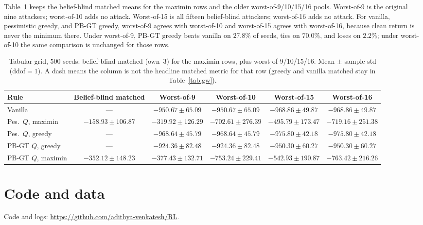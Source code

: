 \documentclass[10pt,twocolumn]{article}
\begin{document}
Table~\ref{tab:gw-w910} keeps the belief-blind matched means for the maximin rows and the older worst-of-9/10/15/16 pools.
Worst-of-9 is the original nine attackers; worst-of-10 adds no attack.
Worst-of-15 is all fifteen belief-blind attackers; worst-of-16 adds no attack.
For vanilla, pessimistic greedy, and PB-GT greedy, worst-of-9 agrees with worst-of-10 and worst-of-15 agrees with worst-of-16, because clean return is never the minimum there.
Under worst-of-9, PB-GT greedy beats vanilla on $27.8\%$ of seeds, ties on $70.0\%$, and loses on $2.2\%$; under worst-of-10 the same comparison is unchanged for those rows.

\begin{table}[t]
\centering
\small
\caption{Tabular grid, $500$ seeds: belief-blind matched (own~3) for the maximin rows, plus worst-of-9/10/15/16.
Mean $\pm$ sample std (ddof${=}1$).
A dash means the column is not the headline matched metric for that row (greedy and vanilla matched stay in Table~\ref{tab:gw}).}
\label{tab:gw-w910}
\setlength{\tabcolsep}{3.5pt}
\begin{tabular}{@{}lccccc@{}}
\toprule
Rule & Belief-blind matched & Worst-of-9 & Worst-of-10 & Worst-of-15 & Worst-of-16 \\
\midrule
Vanilla & --- & $-950.67{\pm}65.09$ & $-950.67{\pm}65.09$ & $-968.86{\pm}49.87$ & $-968.86{\pm}49.87$ \\
Pes.\ $Q$, maximin & $-158.93{\pm}106.87$ & $-319.92{\pm}126.29$ & $-702.61{\pm}276.39$ & $-495.79{\pm}173.47$ & $-719.16{\pm}251.38$ \\
Pes.\ $Q$, greedy & --- & $-968.64{\pm}45.79$ & $-968.64{\pm}45.79$ & $-975.80{\pm}42.18$ & $-975.80{\pm}42.18$ \\
PB-GT $Q$, greedy & --- & $-924.36{\pm}82.48$ & $-924.36{\pm}82.48$ & $-950.30{\pm}60.27$ & $-950.30{\pm}60.27$ \\
PB-GT $Q$, maximin & $-352.12{\pm}148.23$ & $-377.43{\pm}132.71$ & $-753.24{\pm}229.41$ & $-542.93{\pm}190.87$ & $-763.42{\pm}216.26$ \\
\bottomrule
\end{tabular}
\end{table}

\section{Code and data}
\label{app:code}

Code and logs: \url{https://github.com/adithya-venkatesh/RL}.
\end{document}
